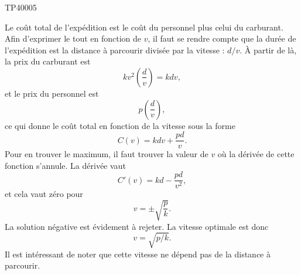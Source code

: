 \begin{corrige}{TP40005}

	Le coût total de l'expédition est le coût du personnel plus celui du carburant. Afin d'exprimer le tout en fonction de $v$, il faut se rendre compte que la durée de l'expédition est la distance à parcourir divisée par la vitesse : $d/v$. À partir de là, la prix du carburant est
	\begin{equation}
		kv^2\left( \frac{ d }{ v } \right)=kdv,
	\end{equation}
	et le prix du personnel est
	\begin{equation}
		p\left( \frac{ d }{ v } \right),
	\end{equation}
	ce qui donne le coût total en fonction de la vitesse sous la forme
	\begin{equation}
		C(v)=kdv+\frac{ pd }{ v }.
	\end{equation}
	Pour en trouver le maximum, il faut trouver la valeur de $v$ où la dérivée de cette fonction s'annule. La dérivée vaut
	\begin{equation}
		C'(v)=kd-\frac{ pd }{ v^2 },
	\end{equation}
	et cela vaut zéro pour
	\begin{equation}
		v=\pm\sqrt{\frac{ p }{ k }}.
	\end{equation}
	La solution négative est évidement à rejeter. La vitesse optimale est donc
	\begin{equation}
		v=\sqrt{p/k}.
	\end{equation}
	Il est intéressant de noter que cette vitesse ne dépend pas de la distance à parcourir.

\end{corrige}
